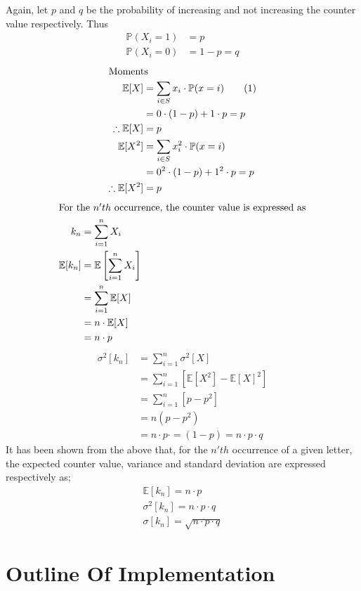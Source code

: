 \documentclass[longpaper, english, final, times]{revdetua}
\begin{document}
		Again, let $p$ and $q$ be the probability of increasing and not increasing the counter value respectively. Thus
		\begin{align*}
			\mathbb{P}(X_i=1)&=p \\
			\mathbb{P}(X_i=0)&=1-p=q
		\end{align*}
		\begin{align*}
			\intertext{Moments}
			\mathbb{E}[X] &= \sum_{i\in S}x_i\cdot \mathbb{P}(x=i) \tag{1}\\
			&=0\cdot (1-p)+1\cdot p=p \\
			\therefore \mathbb{E}[X] &= p \\
			\mathbb{E}[X^2] &= \sum_{i\in S}x_i^2\cdot \mathbb{P}(x=i)\\
			&=0^2\cdot (1-p)+1^2\cdot p=p \\
			\therefore \mathbb{E}[X^2] &= p \\
		\end{align*}
		\begin{align*}
			\intertext{For the $n'th$ occurrence, the counter value is expressed as}
			k_n &= \sum_{i=1}^{n}X_i \\
			\mathbb{E}[k_n]&=\mathbb{E}\left[\sum_{i=1}^{n}X_i\right]\\
			&=\sum_{i=1}^{n}\mathbb{E}[X] \\
			&=n\cdot \mathbb{E}[X] \\
			&=n\cdot p
		\end{align*}
		\begin{align*}
			\sigma^2[k_n]&=\sum_{i=1}^{n}\sigma^2\left[X\right]\\
			&=\sum_{i=1}^{n}\left[\mathbb{E}[X^2]-\mathbb{E}[X]^2\right] \\
			&=\sum_{i=1}^{n}\left[p-p^2\right]\\
			&=n(p-p^2) \\
			&=n\cdot p\cdot=(1-p)=n\cdot p\cdot q
		\end{align*}
		It has been shown from the above that, for the $n'th$ occurrence of a given letter, the expected counter value, variance and standard deviation are expressed respectively as;
		\begin{align}
			\mathbb{E}[k_n] = n\cdot p \label{equation1}\\
			\sigma^2[k_n] = n\cdot p\cdot q \label{equation2}\\
			\sigma[k_n] = \sqrt{n\cdot p\cdot q} \label{equation3}
		\end{align}
		
			
	\section{Outline Of Implementation}
		
\end{document}
